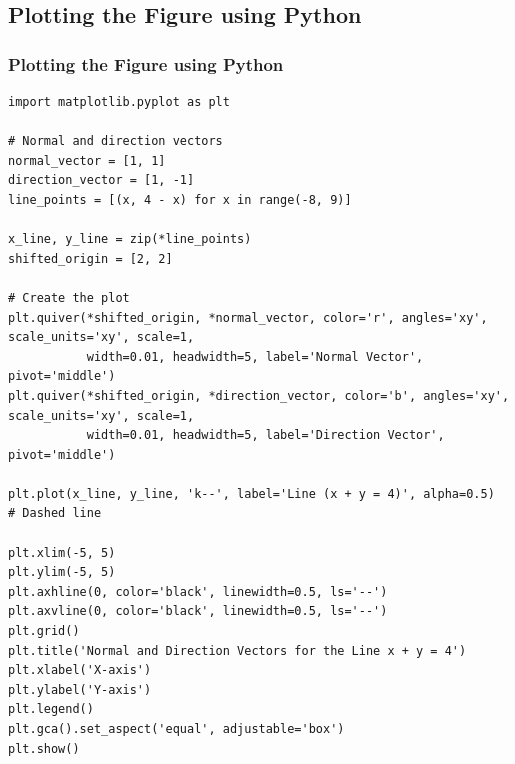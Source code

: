 \documentclass{beamer}
\begin{document}
\subsection{Plotting the Figure using Python}
\begin{frame}[fragile]
\frametitle{Plotting the Figure using Python}
\lstset{basicstyle=\tiny\ttfamily, breaklines=true}
\begin{lstlisting}
import matplotlib.pyplot as plt

# Normal and direction vectors
normal_vector = [1, 1]
direction_vector = [1, -1]
line_points = [(x, 4 - x) for x in range(-8, 9)]

x_line, y_line = zip(*line_points)
shifted_origin = [2, 2]

# Create the plot
plt.quiver(*shifted_origin, *normal_vector, color='r', angles='xy', scale_units='xy', scale=1, 
           width=0.01, headwidth=5, label='Normal Vector', pivot='middle')
plt.quiver(*shifted_origin, *direction_vector, color='b', angles='xy', scale_units='xy', scale=1, 
           width=0.01, headwidth=5, label='Direction Vector', pivot='middle')

plt.plot(x_line, y_line, 'k--', label='Line (x + y = 4)', alpha=0.5)  # Dashed line

plt.xlim(-5, 5)
plt.ylim(-5, 5)
plt.axhline(0, color='black', linewidth=0.5, ls='--')
plt.axvline(0, color='black', linewidth=0.5, ls='--')
plt.grid()
plt.title('Normal and Direction Vectors for the Line x + y = 4')
plt.xlabel('X-axis')
plt.ylabel('Y-axis')
plt.legend()
plt.gca().set_aspect('equal', adjustable='box')
plt.show()
\end{lstlisting}
\end{frame}
\end{document}

